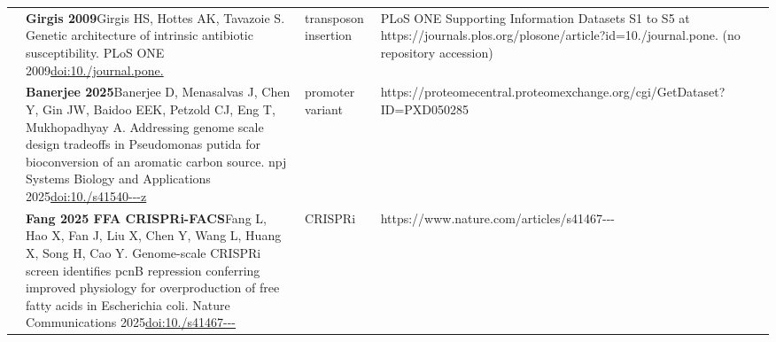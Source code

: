 \begin{landscape}
\begin{longtable}{@{}r@{\hspace{4pt}} L{86mm} L{74mm} L{78mm}@{}}
 & \textbf{Girgis 2009}\newline Girgis HS, Hottes AK, Tavazoie S. Genetic architecture of intrinsic antibiotic susceptibility. PLoS ONE 2009\newline \href{https://doi.org/10.1371/journal.pone.0005629}{doi:10./\allowbreak journal.\allowbreak pone.} & transposon insertion & PLoS ONE Supporting Information Datasets S1 to S5 at https:/\allowbreak /\allowbreak journals.\allowbreak plos.\allowbreak org/\allowbreak plosone/\allowbreak article?id=10./\allowbreak journal.\allowbreak pone. (no repository accession) \\
 & \textbf{Banerjee 2025}\newline Banerjee D, Menasalvas J, Chen Y, Gin JW, Baidoo EEK, Petzold CJ, Eng T, Mukhopadhyay A. Addressing genome scale design tradeoffs in Pseudomonas putida for bioconversion of an aromatic carbon source. npj Systems Biology and Applications 2025\newline \href{https://doi.org/10.1038/s41540-024-00480-z}{doi:10./\allowbreak s41540---\allowbreak z} & promoter variant & https:/\allowbreak /\allowbreak proteomecentral.\allowbreak proteomexchange.\allowbreak org/\allowbreak cgi/\allowbreak GetDataset?ID=PXD050285 \\
 & \textbf{Fang 2025 FFA CRISPRi-FACS}\newline Fang L, Hao X, Fan J, Liu X, Chen Y, Wang L, Huang X, Song H, Cao Y. Genome-scale CRISPRi screen identifies pcnB repression conferring improved physiology for overproduction of free fatty acids in Escherichia coli. Nature Communications 2025\newline \href{https://doi.org/10.1038/s41467-025-58368-3}{doi:10./\allowbreak s41467---} & CRISPRi & https:/\allowbreak /\allowbreak www.\allowbreak nature.\allowbreak com/\allowbreak articles/\allowbreak s41467--- \\

\end{longtable}
\end{landscape}
